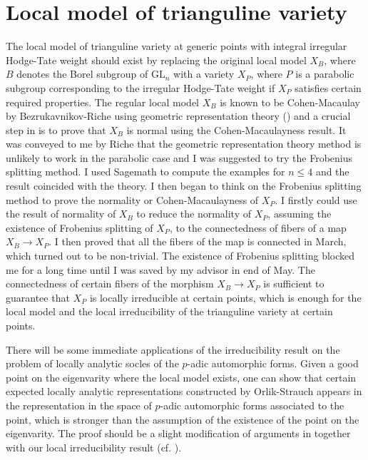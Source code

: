 \documentclass{amsart}
\newcommand{\GL}{\text{GL}}
\numberwithin{equation}{section}
\begin{document}
\section{Local model of trianguline variety}
The local model of trianguline variety at generic points with integral irregular Hodge-Tate weight should exist by replacing the original local model $X_B$, where $B$ denotes the Borel subgroup of $\GL_n$ with a variety $X_P$, where $P$ is a parabolic subgroup corresponding to the irregular Hodge-Tate weight if $X_P$ satisfies certain required properties. The regular local model $X_{B}$ is known to be Cohen-Macaulay by Bezrukavnikov-Riche using geometric representation theory (\cite{riche2008geometric}) and a crucial step in \cite{breuil2019local} is to prove that $X_B$ is normal using the Cohen-Macaulayness result. It was conveyed to me by Riche that the geometric representation theory method is unlikely to work in the parabolic case and I was suggested to try the Frobenius splitting method. I used Sagemath to compute the examples for $n\leq 4$ and the result coincided with the theory. I then began to think on the Frobenius splitting method to prove the normality or Cohen-Macaulayness of $X_P$. I firstly could use the result of normality of $X_B$ to reduce the normality of $X_P$, assuming the existence of Frobenius splitting of $X_P$, to the connectedness of fibers of a map $X_B\rightarrow X_P$. I then proved that all the fibers of the map is connected in March, which turned out to be non-trivial. The existence of Frobenius splitting blocked me for a long time until I was saved by my advisor in end of May. The connectedness of certain fibers of the morphism $X_B\rightarrow X_P$ is sufficient to guarantee that $X_P$ is locally irreducible at certain points, which is enough for the local model and the local irreducibility of the trianguline variety at certain points.\par
There will be some immediate applications of the irreducibility result on the problem of locally analytic socles of the $p$-adic automorphic forms. Given a good point on the eigenvarity where the local model exists, one can show that certain expected locally analytic representations constructed by Orlik-Strauch appears in the representation in the space of $p$-adic automorphic forms associated to the point, which is stronger than the assumption of the existence of the point on the eigenvarity. The proof should be a slight modification of arguments in \cite{breuil2019local} together with our local irreducibility result (cf. \cite{Wu2020unibranch}).\par
\end{document}
